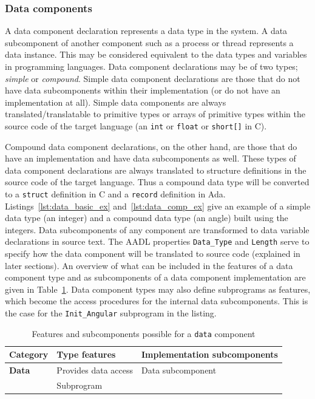 \subsubsection{Data components} A data component declaration
represents a data type in the system. A data subcomponent of another
component such as a process or thread represents a data instance. This
may be considered equivalent to the data types and variables in
programming languages. Data component declarations may be of two
types; \emph{simple} or \emph{compound}. Simple data component
declarations are those that do not have data subcomponents within
their implementation (or do not have an implementation at all). Simple
data components are always translated/translatable to primitive types
or arrays of primitive types within the source code of the target
language (an \texttt{int} or \texttt{float} or \texttt{short[]} in C).

Compound data component declarations, on the other hand, are those
that do have an implementation and have data subcomponents as
well. These types of data component declarations are always translated
to structure definitions in the source code of the target
language. Thus a compound data type will be converted to a
\texttt{struct} definition in C and a \texttt{record} definition in
Ada. Listings~\ref{lst:data_basic_ex} and~\ref{lst:data_comp_ex} give
an example of a simple data type (an integer) and a compound data type
(an angle) built using the integers. Data subcomponents of any
component are transformed to data variable declarations in source
text. The AADL properties \texttt{Data\_Type} and \texttt{Length}
serve to specify how the data component will be translated to source
code (explained in later sections). An overview of what can be
included in the features of a data component type and as subcomponents
of a data component implementation are given in
Table~\ref{tab:data_rules}. Data component types may also define
subprograms as features, which become the access procedures for the
internal data subcomponents. This is the case for the
\texttt{Init\_Angular} subprogram in the listing.

\begin{table}
\centering
\begin{tabular}{|l|l|l|}
\hline
\textbf{Category} & \textbf{Type features} & \textbf{Implementation
  subcomponents} \\
\hline
\textbf{Data} & Provides data access & Data subcomponent\\
 & Subprogram & \\
\hline
\end{tabular}
\caption{Features and subcomponents possible for a \texttt{data}
  component}
\label{tab:data_rules}
\end{table}

